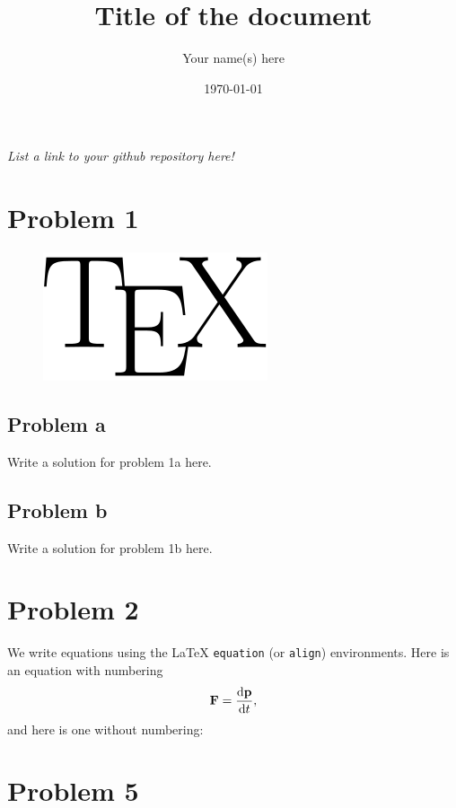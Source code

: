 \documentclass[english,notitlepage]{revtex4-1}  %
\begin{document}
\title{Title of the document}      %
\author{Your name(s) here}          %
\date{\today}                             %
\noaffiliation                            %


\maketitle 
    
\textit{List a link to your github repository here!}

\section*{Problem 1}

\begin{figure}
\includegraphics[scale=0.5]{tex.png}
\end{figure}

\subsection*{Problem a}
Write a solution for problem 1a here.

\subsection*{Problem b}
Write a solution for problem 1b here.

\section*{Problem 2}
We write equations using the LaTeX \texttt{equation} (or \texttt{align}) environments. Here is an equation with numbering
\begin{equation}\label{eq:newton}
    \vb{F} = \dv{\vb{p}}{t},
\end{equation}
and here is one without numbering:

\section*{Problem 5}
\end{document}
